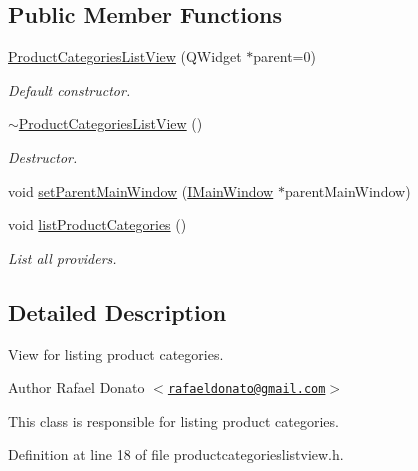 \subsection*{\-Public \-Member \-Functions}
\begin{DoxyCompactItemize}
\item 
\hyperlink{class_product_categories_list_view_ab250934f5d431389ae6527df679f77f2}{\-Product\-Categories\-List\-View} (\-Q\-Widget $\ast$parent=0)
\begin{DoxyCompactList}\small\item\em \-Default constructor. \end{DoxyCompactList}\item 
\hyperlink{class_product_categories_list_view_a8cb2a9e6725bfe54f0826cdc6cd92c51}{$\sim$\-Product\-Categories\-List\-View} ()
\begin{DoxyCompactList}\small\item\em \-Destructor. \end{DoxyCompactList}\item 
void \hyperlink{class_product_categories_list_view_a05ea97193181f3ca2ed9e8b22c5b692a}{set\-Parent\-Main\-Window} (\hyperlink{class_i_main_window}{\-I\-Main\-Window} $\ast$parent\-Main\-Window)
\item 
void \hyperlink{class_product_categories_list_view_acebe9dd6ad877c028da89371c78d8dc8}{list\-Product\-Categories} ()
\begin{DoxyCompactList}\small\item\em \-List all providers. \end{DoxyCompactList}\end{DoxyCompactItemize}


\subsection{\-Detailed \-Description}
\-View for listing product categories. 

\begin{DoxyAuthor}{\-Author}
\-Rafael \-Donato $<$\href{mailto:rafaeldonato@gmail.com}{\tt rafaeldonato@gmail.\-com}$>$
\end{DoxyAuthor}
\-This class is responsible for listing product categories. 

\-Definition at line 18 of file productcategorieslistview.\-h.



